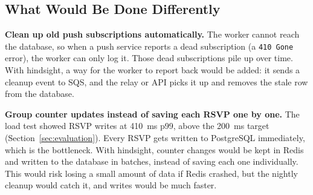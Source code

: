 \subsection{What Would Be Done Differently}

\textbf{Clean up old push subscriptions automatically.} The worker cannot reach the database, so when a push service reports a dead subscription (a \texttt{410 Gone} error), the worker can only log it. Those dead subscriptions pile up over time. With hindsight, a way for the worker to report back would be added: it sends a cleanup event to SQS, and the relay or API picks it up and removes the stale row from the database.

\textbf{Group counter updates instead of saving each RSVP one by one.} The load test showed RSVP writes at 410~ms p99, above the 200~ms target (Section~\ref{sec:evaluation}). Every RSVP gets written to PostgreSQL immediately, which is the bottleneck. With hindsight, counter changes would be kept in Redis and written to the database in batches, instead of saving each one individually. This would risk losing a small amount of data if Redis crashed, but the nightly cleanup would catch it, and writes would be much faster.
